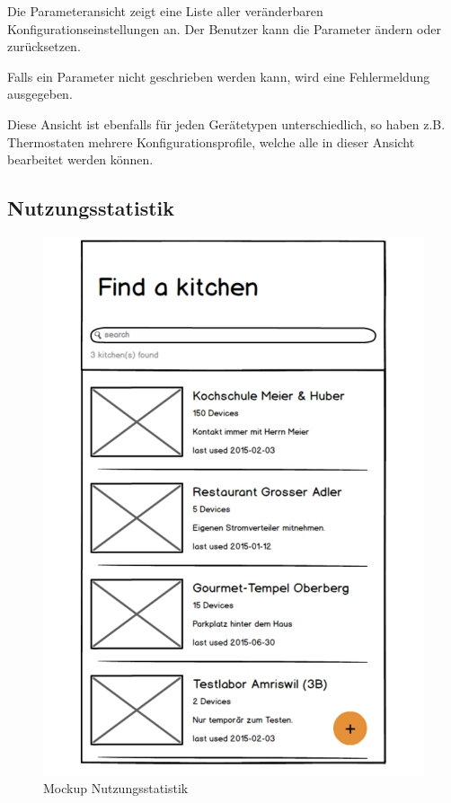 Die Parameteransicht zeigt eine Liste aller veränderbaren Konfigurationseinstellungen an. Der Benutzer kann die Parameter ändern oder zurücksetzen.

Falls ein Parameter nicht geschrieben werden kann, wird eine Fehlermeldung ausgegeben.

Diese Ansicht ist ebenfalls für jeden Gerätetypen unterschiedlich, so haben z.B. Thermostaten mehrere Konfigurationsprofile, welche alle in dieser Ansicht bearbeitet werden können.

\WFclear
\vspace{2cm}

\subsection{Nutzungsstatistik}
\label{subsec:Nutzungsstatistik}

\begin{figure}
	\begin{center}
		\vspace{-1cm}
		\includegraphics[page=7,trim=0 0 0 0,clip,scale=0.21]{uiux/res/mockups}
		\caption{Mockup Nutzungsstatistik}
		\label{abb:mockDeviceUsage}
	\end{center}
\end{figure}

